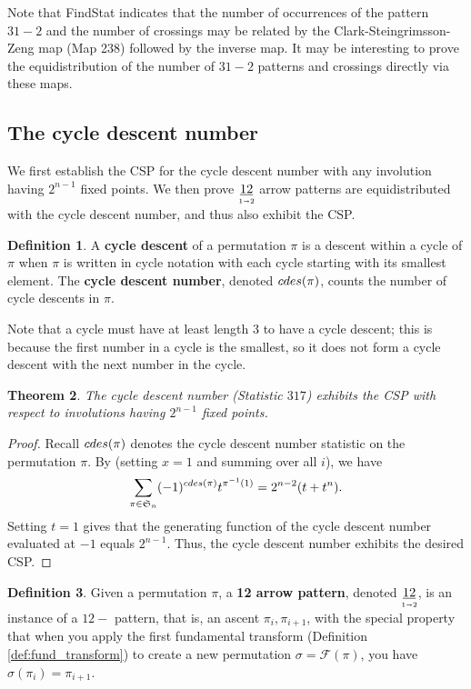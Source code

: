 \documentclass{amsart}
\newtheorem{thm}{Theorem}[section]
\theoremstyle{definition}
\newtheorem{definition}[thm]{Definition}
\newcommand{\arrowpattern}{\underset{\mathsmaller{1\shortrightarrow 2}}{\underline{12}}}
\newcommand{\cdes}{\textnormal{cdes}}
\begin{document}
Note that FindStat indicates that the number of occurrences of the pattern $31-2$ and the number of crossings may be related by the Clark-Steingrimsson-Zeng map (Map 238) \cite{ClarkeSteingrimssonZeng} followed by the inverse map. It may be interesting to prove the equidistribution of the number of $31-2$ patterns and crossings directly via these maps.

\subsection{The cycle descent number}\label{subsec:Corteel descent}
We first establish the CSP for the cycle descent number with any involution having $2^{n-1}$ fixed points. We then prove $\arrowpattern$ arrow patterns are equidistributed with the cycle descent number, and thus also exhibit the CSP. 

\begin{definition}\label{def: cycle descent} A \textbf{cycle descent} of a permutation $\pi$ is a descent within a cycle of $\pi$ when $\pi$ is written in cycle notation with each cycle starting with its smallest element.
  The \textbf{cycle descent number}, denoted $\cdes(\pi)$, counts the number of cycle descents in $\pi.$
\end{definition}
Note that a cycle must have at least length $3$ to have a cycle descent; this is because the first number in a cycle is the smallest, so it does not form a cycle descent with the next number in the cycle.

\begin{thm}\label{thm:cycle_des_CSP}
  The cycle descent number (Statistic $317$) exhibits the CSP with respect to involutions having $2^{n-1}$ fixed points.
\end{thm}
\begin{proof}
  Recall $\cdes(\pi)$ denotes the cycle descent number statistic on the permutation $\pi$.
  By \cite[Theorem 1]{CycleDescent} (setting $x=1$ and summing over all $i$), we have
  \[\sum_{\pi\in\mathfrak{S}_n} (-1)^{\cdes(\pi)}t^{\pi^{-1}(1)}=2^{n-2}(t+t^n).
  \]
  Setting $t=1$ gives that the generating function of the cycle descent number evaluated at $-1$ equals $2^{n-1}$. Thus, the cycle descent number exhibits the desired CSP.
\end{proof}


\begin{definition}
  Given a permutation $\pi$, a \textbf{12 arrow pattern}, denoted  $\arrowpattern$, is an instance of a $12-$ pattern, that is, an ascent $\pi_i,\pi_{i+1}$, with the special property that when you apply the first fundamental transform (Definition \ref{def:fund_transform}) to create a new permutation $\sigma=\mathcal{F}(\pi)$, you have $\sigma(\pi_i)=\pi_{i+1}$.
\end{definition}
\end{document}
